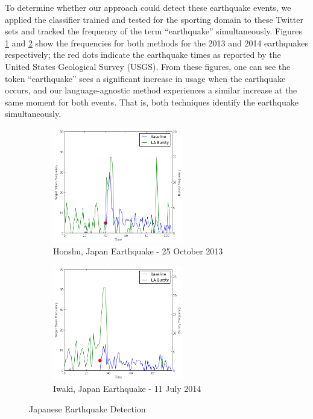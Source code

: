 \documentclass{sig-alternate}
\begin{document}
To determine whether our approach could detect these earthquake events, we applied the classifier trained and tested for the sporting domain to these Twitter sets and tracked the frequency of the term ``earthquake'' simultaneously.
Figures \ref{fig:2013Japan} and \ref{fig:2014Japan} show the frequencies for both methods for the 2013 and 2014 earthquakes respectively; the red dots indicate the earthquake times as reported by the United States Geological Survey (USGS).
From these figures, one can see the token ``earthquake'' sees a significant increase in usage when the earthquake occurs, and our language-agnostic method experiences a similar increase at the same moment for both events.
That is, both techniques identify the earthquake simultaneously.

\begin{figure}
\centering
\begin{subfigure}[b]{0.4\textwidth}
\includegraphics[width=2.25in]{./figures/2013-japan-quake.png}
\caption{Honshu, Japan Earthquake - 25 October 2013}
\label{fig:2013Japan}
\end{subfigure}
\begin{subfigure}[b]{0.4\textwidth}
\includegraphics[width=2.25in]{./figures/2014-japan-quake.png}
\caption{Iwaki, Japan Earthquake - 11 July 2014}
\label{fig:2014Japan}
\end{subfigure}
\caption{Japanese Earthquake Detection}
\label{fig:joinedEarthquake}
\end{figure}
\end{document}
